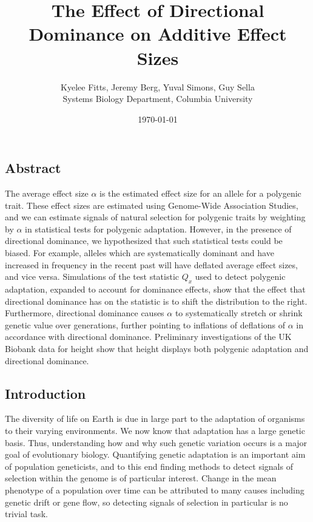 \documentclass[a4paper,12pt]{article}
\begin{document}
\title{\vspace{-2cm}
  The Effect of Directional Dominance on Additive Effect Sizes
}
\author{\normalsize{Kyelee Fitts, Jeremy Berg, Yuval Simons, Guy
    Sella \\
  \small{Systems Biology Department, Columbia University}}}
\date{\normalsize{\today}}
\maketitle



\subsection*{Abstract}
The average effect size $\alpha$ is the estimated effect size for an
allele for a polygenic trait. These effect sizes are estimated using
Genome-Wide Association Studies, and we can estimate signals of natural
selection for polygenic traits by weighting by $\alpha$ in statistical
tests for polygenic adaptation. However, in the presence of
directional dominance, we hypothesized that such statistical tests
could be biased. For example, alleles which are systematically
dominant and have increased in frequency in the recent past will have
deflated average effect sizes, and vice versa. Simulations of the test
statistic $Q_x$ used to detect polygenic adaptation, expanded to
account for dominance effects, show that the effect that directional
dominance has on the statistic is to shift the distribution to the
right. Furthermore, directional dominance causes $\alpha$ to
systematically stretch or shrink genetic value over generations,
further pointing to inflations of deflations of $\alpha$ in accordance
with directional dominance. Preliminary investigations of the UK
Biobank data for height show that height displays both polygenic
adaptation and directional dominance.


\subsection*{Introduction}

The diversity of life on Earth is due in large part to the
adaptation of organisms to their varying environments. We now know that
adaptation has a large genetic basis. Thus, understanding how and why such
genetic variation occurs is a major goal of evolutionary
biology. Quantifying genetic adaptation is an important aim of population
geneticists, and to this end finding methods to detect signals of
selection within the genome is of particular interest. Change in the
mean phenotype of a population over time can be attributed to many causes including genetic
drift or gene flow, so detecting signals of selection in
particular is no trivial task.
\end{document}
